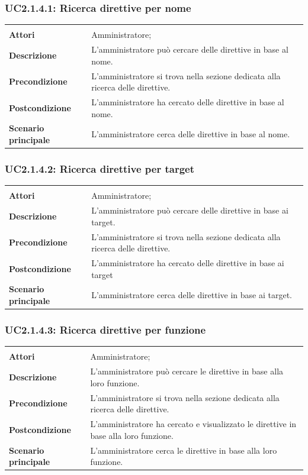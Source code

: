 \subsubsection{UC2.1.4.1: Ricerca direttive per nome}
\label{UC2.1.4.1}
\begin{longtable}{l|p{10cm}}
\hline
&\\
\textbf{Attori} & Amministratore;\\[7pt]
\textbf{Descrizione} & L'amministratore può cercare delle direttive in base al nome.\\[7pt]
\textbf{Precondizione} & L'amministratore si trova nella sezione dedicata alla ricerca delle direttive.\\[7pt]
\textbf{Postcondizione} & L'amministratore ha cercato delle direttive in base al nome.\\[7pt]
\textbf{Scenario principale} & L'amministratore cerca delle direttive in base al nome.\\[7pt]\hline
\end{longtable}

\subsubsection{UC2.1.4.2: Ricerca direttive per target}
\label{UC2.1.4.2}
\begin{longtable}{l|p{10cm}}
\hline
&\\
\textbf{Attori} & Amministratore;\\[7pt]
\textbf{Descrizione} & L'amministratore può cercare delle direttive in base ai target.\\[7pt]
\textbf{Precondizione} & L'amministratore si trova nella sezione dedicata alla ricerca delle direttive.\\[7pt]
\textbf{Postcondizione} & L'amministratore ha cercato delle direttive in base ai target\\[7pt]
\textbf{Scenario principale} & L'amministratore cerca delle direttive in base ai target.\\[7pt]\hline
\end{longtable}

\subsubsection{UC2.1.4.3: Ricerca direttive per funzione}
\label{UC2.1.4.3}
\begin{longtable}{l|p{10cm}}
\hline
&\\
\textbf{Attori} & Amministratore;\\[7pt]
\textbf{Descrizione} & L'amministratore può cercare le direttive in base alla loro funzione.\\[7pt]
\textbf{Precondizione} & L'amministratore si trova nella sezione dedicata alla ricerca delle direttive.\\[7pt]
\textbf{Postcondizione} & L'amministratore ha cercato e visualizzato le direttive in base alla loro funzione.\\[7pt]
\textbf{Scenario principale} & L'amministratore cerca le direttive in base alla loro funzione.\\[7pt]\hline
\end{longtable}

